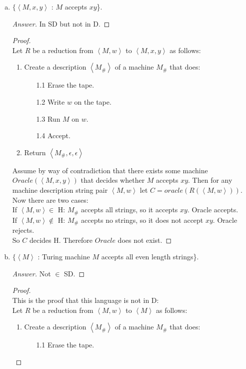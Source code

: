\documentclass[10pt]{article}
\newcommand{\brackets}[1]{\left< #1 \right>}
\begin{document}
\begin{enumerate}[1)]
\begin{enumerate}[a)]
\item
$\{\brackets{M, x, y}$ : $M$ accepts $xy$\}.
\begin{proof}[Answer]
In SD but not in D.
\end{proof}
\begin{proof}[Proof]$ $\\
Let $R$ be a reduction from $\brackets{M, w}$ to $\brackets{M, x, y}$ as follows:
\begin{enumerate}[1.]
\item
Create a description $\brackets{M_\#}$ of a machine $M_\#$ that does:
\begin{enumerate}
\item[1.1]
Erase the tape.

\item[1.2]
Write $w$ on the tape.

\item[1.3]
Run $M$ on $w$.

\item[1.4]
Accept.
\end{enumerate}
\item
Return $\brackets{M_\#, \epsilon, \epsilon}$
\end{enumerate}


Assume by way of contradiction that there exists some machine $Oracle(\brackets{M, x, y})$ that decides whether $M$ accepts $xy$.  Then for any machine description string pair $\brackets{M, w}$ let $C = oracle(R(\brackets{M, w}))$. Now there are two cases:\\

If $\brackets{M, w} \in$ H: $M_\#$ accepts all strings, so it accepts $xy$.  Oracle accepts.\\
If $\brackets{M, w} \not \in$ H: $M_\#$ accepts no strings, so it does not accept $xy$.  Oracle rejects.\\

So $C$ decides H.  Therefore $Oracle$ does not exist.
\end{proof}

\pagebreak
\item
$\{\brackets{M}$ : Turing machine $M$ accepts all even length strings\}.
\begin{proof}[Answer]
Not $\in$ SD.
\end{proof}
\begin{proof}[Proof]$ $\\
This is the proof that this language is not in D:\\

Let $R$ be a reduction from $\brackets{M, w}$ to $\brackets{M}$ as follows:
\begin{enumerate}[1.]
\item
Create a description $\brackets{M_\#}$ of a machine $M_\#$ that does:
\begin{enumerate}
\item[1.1]
Erase the tape.


\end{enumerate}
\end{enumerate}
\end{proof}
\end{enumerate}
\end{enumerate}
\end{document}
